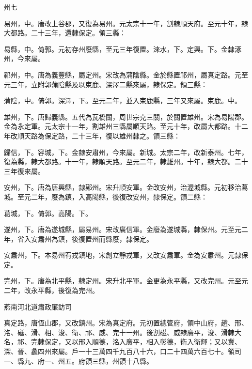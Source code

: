 \begin{pinyinscope}
 州七



 易州，中。唐改上谷郡，又復為易州。元太宗十一年，割隸順天府。至元十年，隸大都路。二十三年，還隸保定。領三縣：



 易縣，中。倚郭。元初存州廢縣，至元三年復置。淶水，下。定興。下。金隸涿州，今來屬。



 祁州，中。唐為義豐縣，屬定州。宋改為蒲陰縣。金於縣置祁州，屬真定路。元至元三年，立附郭蒲陰縣及以束鹿、深澤二縣來屬，隸保定。領三縣：



 蒲陰，中。倚郭。深澤，下。至元二年，並入束鹿縣，三年又來屬。束鹿。中。



 雄州，下。唐歸義縣。五代為瓦橋關，周世宗克三關，於關置雄州。宋為易陽郡。金為永定軍。元太宗十一年，割雄州三縣屬順天路。至元十年，改屬大都路。十二年改順天路為保定路，二十三年，復以雄州隸之。領三縣：



 歸信，下。容城，下。金隸安肅州，今來屬。新城。太宗二年，改新泰州。七年，復為縣，隸大都路。十一年，隸順天路。至元二年，隸雄州。十年，隸大都。二十三年復來屬。



 安州，下。唐為唐興縣，隸鄚州。宋升順安軍。金改安州，治渥城縣。元初移治葛城。至元二年，廢為鎮，入高陽縣，後復改安州，隸保定。領二縣：



 葛城，下。倚郭。高陽。下。



 遂州，下。唐為遂城縣，屬易州。宋改廣信軍。金廢為遂城縣，隸保州。元至元二年，省入安肅州為鎮，後復置州而縣廢，隸保定。



 安肅州，下。本易州宥戎鎮地，宋創立靜戎軍，又改安肅軍。金為安肅州。元隸保定。



 完州，下。唐為北平縣，隸定州。宋升北平軍。金更為永平縣，又改完州。元至元二年，改永平縣，後復為完州。



 燕南河北道肅政廉訪司



 真定路，唐恆山郡，又改鎮州。宋為真定府。元初置總管府，領中山府，趙、邢、洺、磁、滑、相、浚、衛、祁、威、完十一州。後割磁、威隸廣平，浚、滑隸大名，祁、完隸保定，又以邢入順德，洺入廣平，相入彰德，衛入衛輝；又以冀、深、晉、蠡四州來屬。戶一十三萬四千九百八十六，口二十四萬六百七十。領司一、縣九、府一、州五。府領三縣，州領十八縣。




\end{pinyinscope}
